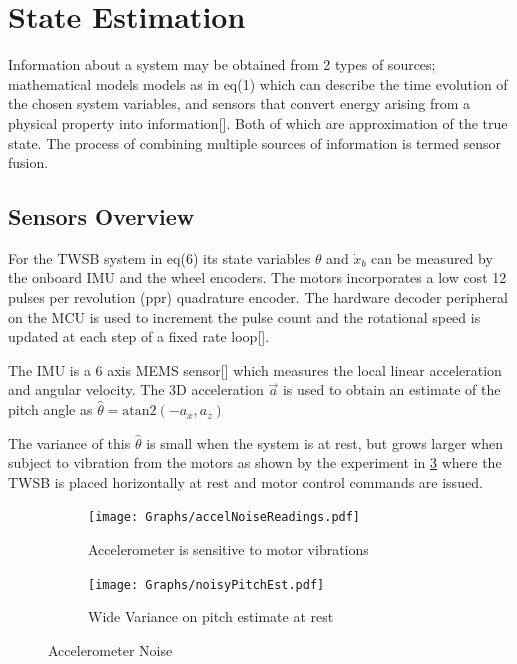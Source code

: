     \section{State Estimation}
    Information about a system may be obtained from 2 types of sources; 
    mathematical models models as in eq(1) which can describe the time evolution of the chosen system variables, 
    and sensors that convert energy arising from a physical property into information[]. Both of which are approximation of the true state. 
    The process of combining multiple sources of information is termed sensor fusion.

    \subsection{Sensors Overview}
        For the TWSB system in eq(6) its state variables $\theta$ and $\dot x_b$ can be measured by the onboard IMU and the wheel encoders.
        The motors incorporates a low cost 12 pulses per revolution (ppr) quadrature encoder. The hardware decoder peripheral on the MCU
        is used to increment the pulse count and the rotational speed is updated at each step of a fixed rate loop[].
        
        The IMU is a 6 axis MEMS sensor[] which measures the local linear acceleration 
        and angular velocity.
        The 3D acceleration $\vec{a}$ is used to obtain an 
        estimate of the pitch angle as    $\hat{\theta} = \mathrm{atan2}\left(-a_x ,a_z \right)$

        The variance of this $\hat{\theta}$ is small when the system is at rest, but grows larger when subject to vibration from the motors
        as shown by the experiment in \ref{fig:accelNoise} where the TWSB is placed horizontally at rest and motor control commands are issued. 
        \begin{figure}[H]
            \centering
            \begin{subfigure}[b]{0.5\textwidth}

                \texttt{[image: Graphs/accelNoiseReadings.pdf]}
                \caption{Accelerometer is sensitive to motor vibrations}
                \label{fig:accelRaw}
                
            \end{subfigure}
            \hfill
            \begin{subfigure}[b]{0.45\textwidth}
                \texttt{[image: Graphs/noisyPitchEst.pdf]}
                \caption{Wide Variance on pitch estimate at rest}
                \label{fig:pitchNoise}
            \label{fig:accelNoise}
            \end{subfigure}
            \caption{Accelerometer Noise}   
        \end{figure}

